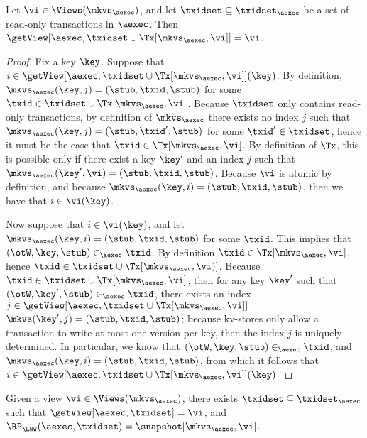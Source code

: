 \begin{proposition}
\label{prop:getview.tx}
Let $\vi \in \Views(\mkvs_{\aexec})$, and let $\txidset \subseteq \txidset_{\aexec}$ be a 
set of read-only transactions in $\aexec$. Then 
$\getView[\aexec, \txidset \cup \Tx[\mkvs_{\aexec}, \vi]] = \vi$. 
\end{proposition}

\begin{proof}
Fix a key $\key$. Suppose that $i \in \getView[\aexec, \txidset \cup \Tx[\mkvs_{\aexec}, \vi]](\key)$. 
By definition, $\mkvs_{\aexec}(\key, j) = (\stub, \txid, \stub)$ for some $\txid \in \txidset \cup \Tx[\mkvs_{\aexec}, \vi]$. 
Because $\txidset$ only contains read-only transactions, by definition of $\mkvs_{\aexec}$ there exists 
no index $j$ such that $\mkvs_{\aexec}(\key, j) = (\stub, \txid', \stub)$ for some $\txid' \in \txidset$, 
hence it must be the case that $\txid \in \Tx[\mkvs_{\aexec}, \vi]$. By definition of $\Tx$, 
this is possible only if there exist a key $\key'$ and an index $j$ such that $\mkvs_{\aexec}(\key', \vi) = (\stub, \txid, \stub)$. 
Because $\vi$ is atomic by definition, and because $\mkvs_{\aexec}(\key, i) = (\stub, \txid, \stub)$, then we have that $i \in \vi(\key)$. 

Now suppose that $i \in \vi(\key)$, and let $\mkvs_{\aexec}(\key, i) = (\stub, \txid, \stub)$ for some $\txid$. 
This implies that $(\otW, \key, \stub) \in_{\aexec} \txid$.
By definition $\txid \in \Tx[\mkvs_{\aexec}, \vi]$, hence $\txid \in \txidset \cup \Tx[\mkvs_{\aexec}, \vi)]$. 
Because $\txid \in \txidset \cup \Tx[\mkvs_{\aexec}, \vi]$, then for any key $\key'$ such that 
$(\otW, \key', \stub) \in_{\aexec} \txid$, there exists an index $j \in \getView[\aexec, \txidset \cup \Tx[\mkvs_{\aexec}, \vi]]$ 
$\mkvs(\key', j) = (\stub, \txid, \stub)$; because kv-stores only allow a transaction to write at most one version 
per key, then the index $j$ is uniquely determined. In particular, we know that $(\otW, \key, \stub) \in_{\aexec} \txid$, 
and $\mkvs_{\aexec}(\key, i) = (\stub, \txid, \stub)$, from which it follows that $i \in \getView[\aexec, \txidset \cup \Tx[\mkvs_{\aexec}, \vi]](\key)$.
\end{proof}


\begin{proposition}
\label{prop:compatible.kv2aexec}
Given a view $\vi \in \Views(\mkvs_{\aexec})$, there exists $\txidset \subseteq \txidset_{\aexec}$ 
such that $\getView[\aexec, \txidset] = \vi$, and $\RP_{\LWW}(\aexec, \txidset) = \snapshot[\mkvs_{\aexec}, \vi]$.
\end{proposition}

